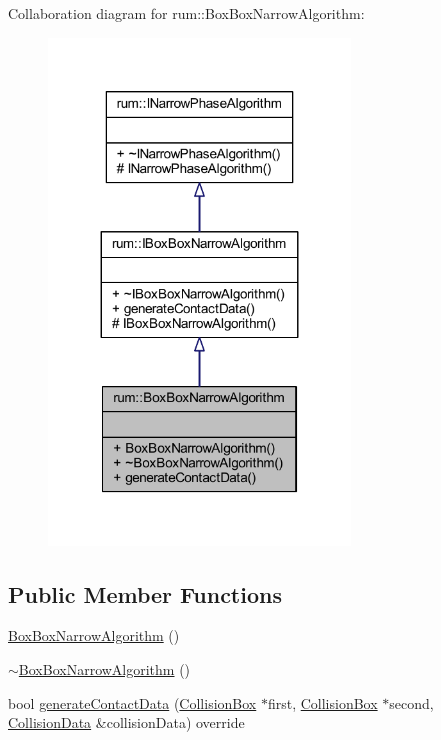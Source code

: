 Collaboration diagram for rum\+:\+:Box\+Box\+Narrow\+Algorithm\+:\nopagebreak
\begin{figure}[H]
\begin{center}
\leavevmode
\includegraphics[width=227pt]{classrum_1_1_box_box_narrow_algorithm__coll__graph}
\end{center}
\end{figure}
\subsection*{Public Member Functions}
\begin{DoxyCompactItemize}
\item 
\mbox{\hyperlink{classrum_1_1_box_box_narrow_algorithm_ac528055fb9d141529e4189e8941ec38d}{Box\+Box\+Narrow\+Algorithm}} ()
\item 
\mbox{\hyperlink{classrum_1_1_box_box_narrow_algorithm_ae353c88f4df350e90768fbb9efa3e32c}{$\sim$\+Box\+Box\+Narrow\+Algorithm}} ()
\item 
bool \mbox{\hyperlink{classrum_1_1_box_box_narrow_algorithm_a5af29d0be22a3d56408d987643830058}{generate\+Contact\+Data}} (\mbox{\hyperlink{classrum_1_1_collision_box}{Collision\+Box}} $\ast$first, \mbox{\hyperlink{classrum_1_1_collision_box}{Collision\+Box}} $\ast$second, \mbox{\hyperlink{classrum_1_1_collision_data}{Collision\+Data}} \&collision\+Data) override
\end{DoxyCompactItemize}
